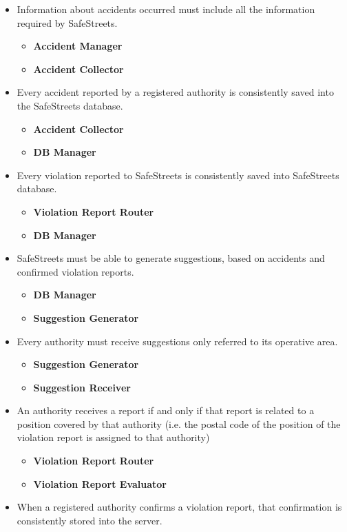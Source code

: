 \documentclass{article}
\newcommand\requirement[1]{\item[{[R#1]}] }
\begin{document}
\begin{itemize}
			\requirement{15} Information about accidents occurred must include all the information required by SafeStreets.
			\begin{itemize}
				\item \textbf{Accident Manager}
				\item \textbf{Accident Collector}
			\end{itemize}
			\requirement{16} Every accident reported by a registered authority is consistently saved into the SafeStreets database.
			\begin{itemize}
				\item \textbf{Accident Collector}
				\item \textbf{DB Manager}
			\end{itemize}
			\requirement{17} Every violation reported to SafeStreets is consistently saved into SafeStreets database.
			\begin{itemize}
				\item \textbf{Violation Report Router}
				\item \textbf{DB Manager}
			\end{itemize}
			\requirement{18} SafeStreets must be able to generate suggestions, based on accidents and confirmed violation reports.
			\begin{itemize}
				\item \textbf{DB Manager}
				\item \textbf{Suggestion Generator}
			\end{itemize}
			\requirement{19} Every authority must receive suggestions only referred to its operative area.
			\begin{itemize}
				\item \textbf{Suggestion Generator}
				\item \textbf{Suggestion Receiver}
			\end{itemize}
			\requirement{20} An authority receives a report if and only if that report is related to a position covered by that authority (i.e. the postal code of the position of the violation report is assigned to that authority)
			\begin{itemize}
				\item \textbf{Violation Report Router}
				\item \textbf{Violation Report Evaluator}
			\end{itemize}
			\requirement{21} When a registered authority confirms a violation report, that confirmation is consistently stored into the server.
			\begin{itemize}

\end{itemize}
\end{itemize}
\end{document}

